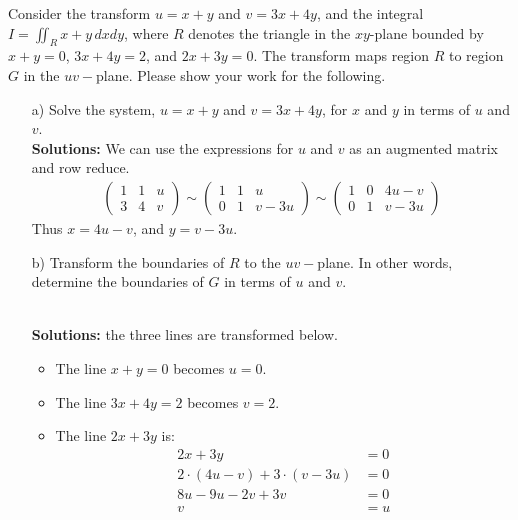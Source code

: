 \fi 









\ifnum {}
    \question[6] Consider the transform $u=x+y$ and $v=3x+4y$, and the integral $\displaystyle I = \iint_{R} x+y \,dxdy$, where $R$ denotes the triangle in the $xy$-plane bounded by $x+y=0$, $3x+4y=2$, and $2x+3y=0$. The transform maps region $R$ to region $G$ in the $uv-$plane. Please show your work for the following.

    \begin{enumerate}
        \item[a)] Solve the system, $u=x+y$ and $v=3x+4y$, for $x$ and $y$ in terms of $u$ and $v$.
            \ifnum {} {\color{DarkBlue} \\[12pt] 
            \textbf{Solutions:}
            We can use the expressions for $u$ and $v$ as an augmented matrix and row reduce. 
            \begin{align}
                \begin{pmatrix} 1 & 1 & u \\ 3 & 4 & v\end{pmatrix} 
                \sim \begin{pmatrix} 1 & 1 & u \\0 & 1 & v - 3u \end{pmatrix} 
                \sim \begin{pmatrix} 1 & 0 & 4u - v \\ 0 & 1 & v - 3u \end{pmatrix} 
            \end{align}
            Thus $x = 4u - v$, and $y = v - 3u$. 
            } 
            \else 
            \vspace{5cm}
            \fi
        \item[b)] Transform the boundaries of $R$ to the $uv-$plane. In other words, determine the boundaries of $G$ in terms of $u$ and $v$. 
            \ifnum {} {\color{DarkBlue} \\[12pt] 
            \textbf{Solutions:} the three lines are transformed below. 
            \begin{itemize}
                \item The line $x+y=0$ becomes $u=0$. 
                \item The line $3x+4y=2$ becomes $v=2$. 
                \item The line $2x+3y$ is: 
                \begin{align}
                    2x+3y &=0 \\
                    2\cdot(4u-v) + 3\cdot(v-3u) &= 0\\
                    8u -9u  - 2v+3v &=0 \\
                    v &= u
                \end{align}
            \end{itemize}
            } 
        \else 
        \vspace{5cm}
        \fi        
            

\end{enumerate}
